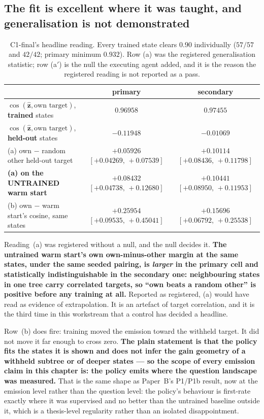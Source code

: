 \documentclass[11pt]{article}
\newcommand{\zz}{\mathbf{z}}
\newcommand{\zhat}{\hat{\zz}}
\begin{document}
\subsection{The fit is excellent where it was taught, and generalisation is not demonstrated}

\begin{table}[h]
\centering\footnotesize\setlength{\tabcolsep}{4pt}
\begin{tabular}{@{}lcc@{}}
\toprule
& \textbf{primary} & \textbf{secondary} \\
\midrule
$\cos(\zhat,\text{own target})$, \textbf{trained} states &
$\mathbf{0.96958}$ & $\mathbf{0.97455}$ \\
$\cos(\zhat,\text{own target})$, \textbf{held-out} states & $\mathbf{-0.11948}$ &
$\mathbf{-0.01069}$ \\
(a) own $-$ random other held-out target & $+0.05926$ $[+0.04269,\,+0.07539]$ &
$+0.10114$ $[+0.08436,\,+0.11798]$ \\
\textbf{(a) on the UNTRAINED warm start} & $\mathbf{+0.08432}$ $[+0.04738,\,+0.12680]$ &
$\mathbf{+0.10441}$ $[+0.08950,\,+0.11953]$ \\
(b) own $-$ warm start's cosine, same states & $+0.25954$ $[+0.09535,\,+0.45041]$ &
$+0.15696$ $[+0.06792,\,+0.25538]$ \\
\bottomrule
\end{tabular}
\caption{C1-final's headline reading. Every trained state clears $0.90$ individually ($57/57$ and
$42/42$; primary minimum $0.932$). Row (a) was the registered generalisation statistic; row
(a$'$) is the null the executing agent added, and it is the reason the registered reading is not
reported as a pass.}
\label{tab:c1final}
\end{table}

Reading~(a) was registered without a null, and the null decides it. \textbf{The untrained warm
start's own own-minus-other margin at the same states, under the same seeded pairing, is
\emph{larger} in the primary cell and statistically indistinguishable in the secondary one:
neighbouring states in one tree carry correlated targets, so ``own beats a random other'' is
positive before any training at all.} Reported as registered, (a) would have read as evidence of
extrapolation. It is an artefact of target correlation, and it is the third time in this workstream
that a control has decided a headline.

Row~(b) does fire: training moved the emission toward the withheld target. It did not move it far
enough to cross zero. \textbf{The plain statement is that the policy fits the states it is shown and
does not infer the gain geometry of a withheld subtree or of deeper states --- so the scope of every
emission claim in this chapter is: the policy emits where the question landscape was measured.} That
is the same shape as Paper~B's P1/P1b result, now at the emission level rather than the question
level: the policy's behaviour is first-rate exactly where it was supervised and no better than the
untrained baseline outside it, which is a thesis-level regularity rather than an isolated
disappointment.
\end{document}
